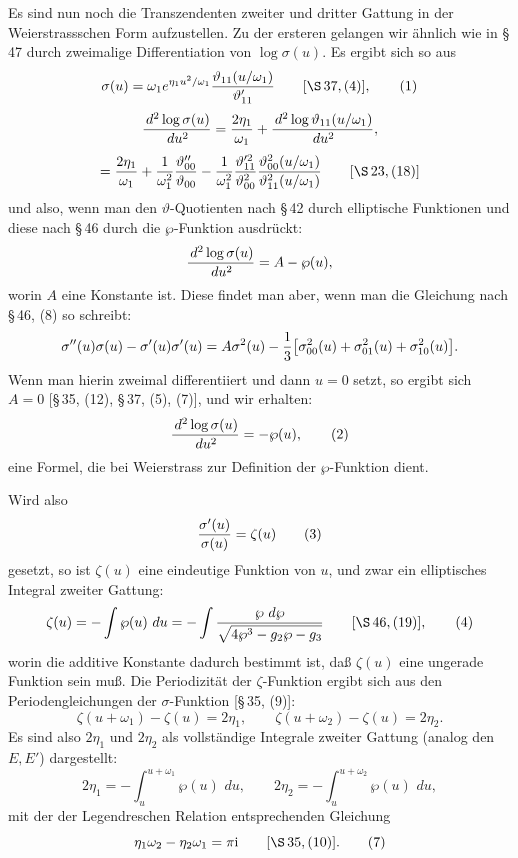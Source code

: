 \documentclass[11pt]{article}
\providecommand{\dd}{\,d}
\providecommand{\tht}{\vartheta}
\providecommand{\ii}{\mathrm{i}}
\begin{document}
Es sind nun noch die Transzendenten zweiter und dritter Gattung in der Weierstrassschen Form aufzustellen. Zu der ersteren gelangen wir ähnlich wie in \S\,47 durch zweimalige Differentiation von $\log\sigma(u)$. Es ergibt sich so aus
\begin{equation}
\sigma(u)=\omega_1 e^{\eta_1u^2/\omega_1}{\tht_{11}(u/\omega_1)\over\tht_{11}'}
\qquad[\S\,37,(4)],
\tag{1}
\end{equation}
\[
{\dd^2\log\sigma(u)\over\dd u^2}
={2\eta_1\over\omega_1}+{\dd^2\log\tht_{11}(u/\omega_1)\over\dd u^2},
\]
\[
={2\eta_1\over\omega_1}+{1\over\omega_1^2}{\tht_{00}''\over\tht_{00}}
-{1\over\omega_1^2}{\tht_{11}'^{2}\over\tht_{00}^{2}}
{\tht_{00}^{2}(u/\omega_1)\over\tht_{11}^{2}(u/\omega_1)}
\qquad[\S\,23,(18)]
\]
und also, wenn man den $\vartheta$-Quotienten nach \S\,42 durch elliptische Funktionen und diese nach \S\,46 durch die $\wp$-Funktion ausdrückt:
\[
{\dd^2\log\sigma(u)\over\dd u^2}=A-\wp(u),
\]
worin $A$ eine Konstante ist. Diese findet man aber, wenn man die Gleichung nach \S\,46, (8) so schreibt:
\[
\sigma''(u)\sigma(u)-\sigma'(u)\sigma'(u)=A\sigma^2(u)-{1\over3}\bigl[\sigma_{00}^{2}(u)+\sigma_{01}^{2}(u)+\sigma_{10}^{2}(u)\bigr].
\]
Wenn man hierin zweimal differentiiert und dann $u=0$ setzt, so ergibt sich $A=0$ [\S\,35, (12), \S\,37, (5), (7)], und wir erhalten:
\begin{equation}
{\dd^2\log\sigma(u)\over\dd u^2}=-\wp(u),
\tag{2}
\end{equation}
eine Formel, die bei Weierstrass zur Definition der $\wp$-Funktion dient.

Wird also
\begin{equation}
{\sigma'(u)\over\sigma(u)}=\zeta(u)
\tag{3}
\end{equation}
gesetzt, so ist $\zeta(u)$ eine eindeutige Funktion von $u$, und zwar ein elliptisches Integral zweiter Gattung:
\begin{equation}
\zeta(u)=-\int\wp(u)\,\dd u=-\int {\wp\,\dd\wp\over\sqrt{4\wp^3-g_2\wp-g_3}}
\qquad[\S\,46,(19)],
\tag{4}
\end{equation}
worin die additive Konstante dadurch bestimmt ist, daß $\zeta(u)$ eine ungerade Funktion sein muß. Die Periodizität der $\zeta$-Funktion ergibt sich aus den Periodengleichungen der $\sigma$-Funktion [\S\,35, (9)]:
\begin{equation}
\zeta(u+\omega_1)-\zeta(u)=2\eta_1,
\qquad
\zeta(u+\omega_2)-\zeta(u)=2\eta_2.
\tag{5}
\end{equation}
Es sind also $2\eta_1$ und $2\eta_2$ als vollständige Integrale zweiter Gattung (analog den $E,E'$) dargestellt:
\begin{equation}
2\eta_1=-\int_u^{u+\omega_1}\wp(u)\,\dd u,
\qquad
2\eta_2=-\int_u^{u+\omega_2}\wp(u)\,\dd u,
\tag{6}
\end{equation}
mit der der Legendreschen Relation entsprechenden Gleichung
\begin{equation}
\eta_1\omega_2-\eta_2\omega_1=\pi\ii\qquad[\S\,35,(10)].
\tag{7}
\end{equation}
\end{document}
